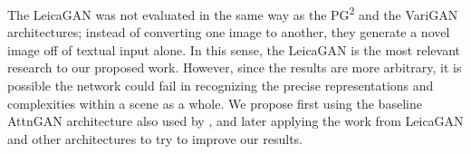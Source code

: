 \documentclass[letterpaper]{article} %
\begin{document}
The LeicaGAN was not evaluated in the same way as the PG\textsuperscript{2} and
the VariGAN architectures; instead of converting one image to another, they
generate a novel image off of textual input alone. In this sense, the LeicaGAN
is the most relevant research to our proposed work. However, since the results
are more arbitrary, it is possible the network could fail in recognizing the
precise representations and complexities within a scene as a whole.
We propose first using the baseline AttnGAN architecture also used by 
\cite{leica}, and later applying the work from LeicaGAN and other architectures 
to try to improve our results.

%




\end{document}
